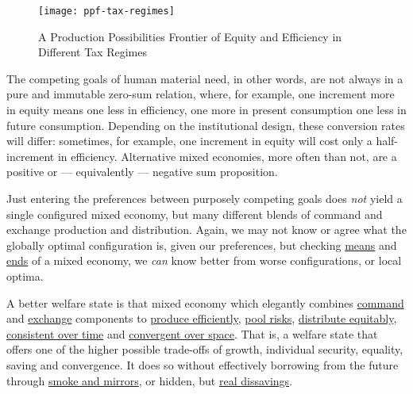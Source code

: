 
\begin{figure}[htbp]
	\centering
	\texttt{[image: ppf-tax-regimes]}
	\caption[Equity-Efficiency Trade-offs of Different Tax Regimes]{A Production Possibilities Frontier of Equity and Efficiency in Different Tax Regimes}
	\label{fig:ppf-tax-regimes} %
\end{figure}

The competing goals of human material need, in other words, are not always in a pure and immutable zero-sum relation, where, for example, one increment more in equity means one less in efficiency, one more in present consumption one less in future consumption.
Depending on the institutional design, these conversion rates will differ:
sometimes, for example, one increment in equity will cost only a half-increment in efficiency.
Alternative mixed economies, more often than not, are a positive or --- equivalently --- negative sum proposition.

Just entering the preferences between purposely competing goals does \emph{not} yield a single configured mixed economy, but many different blends of command and exchange production and distribution.
Again, we may not know or agree what the globally optimal configuration is, given our preferences, but checking \hyperref[sec:means]{means} and \hyperref[sec:ends]{ends} of a mixed economy, we \emph{can} know better from worse configurations, or local optima.

A better welfare state is that mixed economy which elegantly combines \hyperref[sec:command]{command} and \hyperref[sec:exchange]{exchange} components to \hyperref[sec:production]{produce efficiently}, \hyperref[sec:risk]{pool risks}, \hyperref[sec:distribution]{distribute equitably}, \hyperref[sec:time]{consistent over time} and \hyperref[sec:space]{convergent over space}.
That is, a welfare state that offers one of the higher possible trade-offs of growth, individual security, equality, saving and convergence.
It does so without effectively borrowing from the future through \hyperref[sec:smoke-n-mirrors]{smoke and mirrors}, or hidden, but \hyperref[sec:real-dissavings]{real dissavings}.


